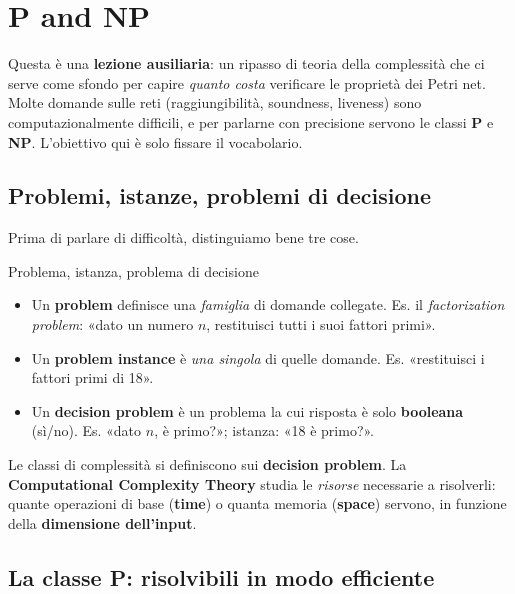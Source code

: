\chapter{\texorpdfstring{P and NP}{P and NP}}
\label{ch:17aux}

Questa è una \textbf{lezione ausiliaria}: un ripasso di teoria della complessità che ci serve come sfondo per capire \emph{quanto costa} verificare le proprietà dei Petri net. Molte domande sulle reti (raggiungibilità, soundness, liveness) sono computazionalmente difficili, e per parlarne con precisione servono le classi \textbf{P} e \textbf{NP}. L'obiettivo qui è solo fissare il vocabolario.

\section{\texorpdfstring{Problemi, istanze, problemi di decisione}{Problemi, istanze, problemi di decisione}}

Prima di parlare di difficoltà, distinguiamo bene tre cose.

\begin{boxdefinition}{Problema, istanza, problema di decisione}
\begin{itemize}
\item Un \textbf{problem} definisce una \emph{famiglia} di domande collegate. Es. il \emph{factorization problem}: «dato un numero $n$, restituisci tutti i suoi fattori primi».
\item Un \textbf{problem instance} è \emph{una singola} di quelle domande. Es. «restituisci i fattori primi di 18».
\item Un \textbf{decision problem} è un problema la cui risposta è solo \textbf{booleana} (sì/no). Es. «dato $n$, è primo?»; istanza: «18 è primo?».
\end{itemize}
\end{boxdefinition}

Le classi di complessità si definiscono sui \textbf{decision problem}. La \textbf{Computational Complexity Theory} studia le \emph{risorse} necessarie a risolverli: quante operazioni di base (\textbf{time}) o quanta memoria (\textbf{space}) servono, in funzione della \textbf{dimensione dell'input}.

\section{\texorpdfstring{La classe P: risolvibili in modo efficiente}{La classe P: risolvibili in modo efficiente}}


